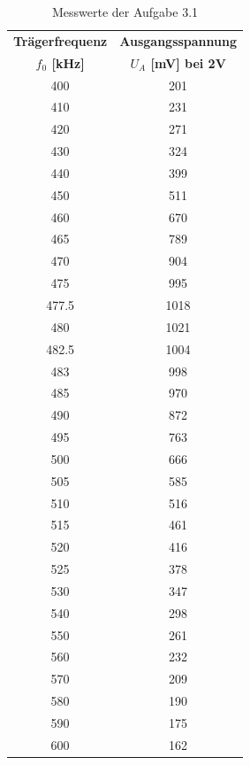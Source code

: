 \documentclass[12pt]{scrartcl}
\begin{document}
\begin{table}[H] 
    \centering
    \begin{tabular}{|c|c|} 
          \hline \textbf{Trägerfrequenz} & \textbf{Ausgangsspannung} \\ 
          \textbf{ $f_0$ [kHz]}    & \textbf{$U_A$ [mV] bei 2V}       \\ \hline
            400  &  201  \\ \hline
            410  &  231  \\ \hline
            420  &  271  \\ \hline
            430  &  324  \\ \hline
            440  &  399  \\ \hline
            450  &  511  \\ \hline
            460  &  670  \\ \hline
            465  &  789  \\ \hline
            470  &  904  \\ \hline
            475  &  995  \\ \hline
            477.5& 1018  \\ \hline
            480  & 1021  \\ \hline
            482.5& 1004  \\ \hline
            483  &  998  \\ \hline
            485  &  970  \\ \hline
            490  &  872  \\ \hline 
            495  &  763  \\ \hline 
            500  &  666  \\ \hline
            505  &  585  \\ \hline
            510  &  516  \\ \hline
            515  &  461  \\ \hline  
            520  &  416  \\ \hline
            525  &  378  \\ \hline  
            530  &  347  \\ \hline 
            540  &  298  \\ \hline 
            550  &  261  \\ \hline
            560  &  232  \\ \hline
            570  &  209  \\ \hline    
            580  &  190  \\ \hline 
            590  &  175  \\ \hline
            600  &  162  \\ \hline      
    \end{tabular}
    \caption{Messwerte der Aufgabe 3.1} \label{tab:Aufgabe3.1}
\end{table}
\end{document}

